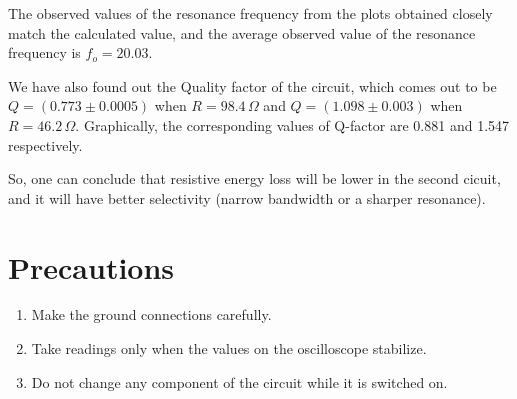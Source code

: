 The observed values of the resonance frequency from the plots obtained closely match the calculated value, and the average observed value of the resonance frequency is $f_o=20.03$.

We have also found out the Quality factor of the circuit, which comes out to be $Q=(0.773\pm0.0005)$ when $R=98.4\,\Omega$ and $Q=(1.098\pm0.003)$ when $R=46.2\,\Omega$. Graphically, the corresponding values of Q-factor are 0.881 and 1.547 respectively.

So, one can conclude that resistive energy loss will be lower in the second cicuit, and it will have better selectivity (narrow bandwidth or a sharper resonance).

\section{Precautions}
\begin{enumerate}
    \item Make the ground connections carefully.
    \item Take readings only when the values on the oscilloscope stabilize.
    \item Do not change any component of the circuit while it is switched on.
\end{enumerate}